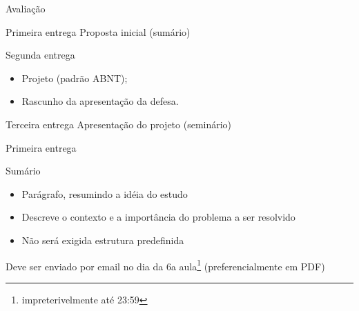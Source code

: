 \documentclass{beamer}
\begin{document}
\begin{frame}{Avaliação}
  \begin{block}{Primeira entrega}
    Proposta inicial (sumário)
  \end{block}

  \pause

  \begin{block}{Segunda entrega}
    \begin{itemize}
    \item Projeto (padrão ABNT);
    \item Rascunho da apresentação da defesa.
    \end{itemize}
  \end{block}

  \pause

  \begin{block}{Terceira entrega}
    Apresentação do projeto (seminário)
  \end{block}

\end{frame}

\begin{frame}{Primeira entrega}
  \begin{block}{Sumário}
    \begin{itemize}
    \item Parágrafo, resumindo a idéia do estudo
    \item Descreve o contexto e a importância do problema a ser resolvido
    \item Não será exigida estrutura predefinida
    \end{itemize}
  \end{block}
  Deve ser enviado por email no dia da 6a aula\footnote{impreterivelmente até 23:59} (preferencialmente em PDF)
\end{frame}
\end{document}
